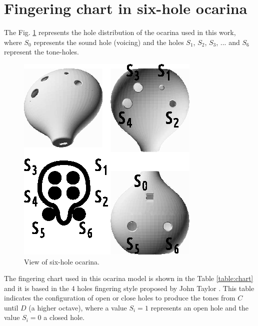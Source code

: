 \documentclass[11pt,twocolumn]{article}
\begin{document}
\section{Fingering chart in six-hole ocarina}
The Fig. \ref{fig:ocarinaview} represents the hole distribution of the ocarina
used in this work, where $S_0$ represents the sound hole (voicing)
and the holes $S_1$, $S_2$, $S_3$, ... and $S_6$ represent the tone-holes.
\begin{figure}[ht!]
\centering
\includegraphics[width=0.750\columnwidth]{ocarina-view.eps}
\caption{View of six-hole ocarina. }
\label{fig:ocarinaview}
\end{figure}
The fingering chart used in this ocarina model is shown in the Table \ref{table:chart} and it is based in the 
4 holes fingering style proposed by John Taylor \citep[pp. 79, 146]{metropolitan1985american} \citep[pp. 30]{1999air}. 
This table indicates the configuration of open or close holes
to produce the tones from $C$ until $D$ (a higher octave), where a value $S_i=1$ represents an 
open hole and the value $S_i=0$ a closed hole.
\end{document}
